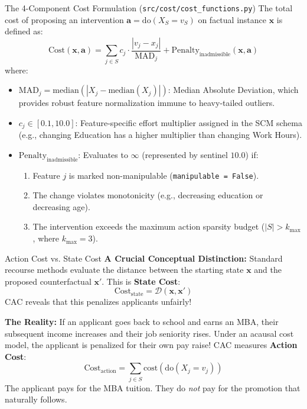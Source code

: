 \documentclass[11pt,a4paper]{article}
\begin{document}
\begin{parentconcept}{The 4-Component Cost Formulation (\texttt{src/cost/cost\_functions.py})}
The total cost of proposing an intervention $\mathbf{a} = \mathrm{do}(X_S = v_S)$ on factual instance $\mathbf{x}$ is defined as:
\begin{equation}
\mathrm{Cost}(\mathbf{x}, \mathbf{a}) = \sum_{j \in S} c_j \cdot \frac{|v_j - x_j|}{\mathrm{MAD}_j} + \mathrm{Penalty}_{\text{inadmissible}}(\mathbf{x}, \mathbf{a})
\end{equation}
where:
\begin{itemize}[leftmargin=1.5em]
    \item $\mathrm{MAD}_j = \mathrm{median}(|X_j - \mathrm{median}(X_j)|)$: Median Absolute Deviation, which provides robust feature normalization immune to heavy-tailed outliers.
    \item $c_j \in [0.1, 10.0]$: Feature-specific effort multiplier assigned in the SCM schema (e.g., changing Education has a higher multiplier than changing Work Hours).
    \item $\mathrm{Penalty}_{\text{inadmissible}}$: Evaluates to $\infty$ (represented by sentinel $10.0$) if:
    \begin{enumerate}
        \item Feature $j$ is marked non-manipulable (\texttt{manipulable = False}).
        \item The change violates monotonicity (e.g., decreasing education or decreasing age).
        \item The intervention exceeds the maximum action sparsity budget ($|S| > k_{\max}$, where $k_{\max} = 3$).
    \end{enumerate}
\end{itemize}
\end{parentconcept}

\begin{childbranch}{Action Cost vs. State Cost}
\textbf{A Crucial Conceptual Distinction:}
Standard recourse methods evaluate the distance between the starting state $\mathbf{x}$ and the proposed counterfactual $\mathbf{x}'$. This is \textbf{State Cost}:
\begin{equation}
\mathrm{Cost}_{\text{state}} = \mathcal{D}(\mathbf{x}, \mathbf{x}')
\end{equation}
CAC reveals that this penalizes applicants unfairly! 

\medskip\noindent
\textbf{The Reality:}
If an applicant goes back to school and earns an MBA, their subsequent income increases and their job seniority rises. Under an acausal cost model, the applicant is penalized for their own pay raise! 
CAC measures \textbf{Action Cost}:
\begin{equation}
\mathrm{Cost}_{\text{action}} = \sum_{j \in S} \mathrm{cost}(\mathrm{do}(X_j = v_j))
\end{equation}
The applicant pays for the MBA tuition. They do \emph{not} pay for the promotion that naturally follows.
\end{childbranch}
\end{document}
